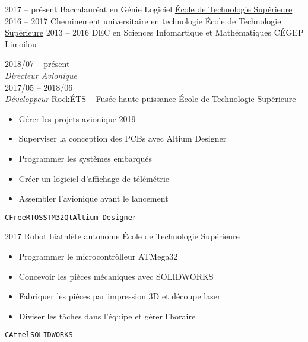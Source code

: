 \documentclass[9pt]{developercv} %
\begin{document}
\begin{minipage}[t]{0.8\textwidth}

\begin{entrylist}
	\entry
		{2017 -- présent}
		{Baccalauréat en Génie Logiciel}
		{\href{https://etsmtl.ca}{École de Technologie Supérieure}}
		{\vspace{-14pt}}
	\entry
		{2016 -- 2017}
		{Cheminement universitaire en technologie}
		{\href{https://etsmtl.ca}{École de Technologie Supérieure}}
		{\vspace{-14pt}}
	\entry
		{2013 -- 2016}
		{DEC en Sciences Infomartique et Mathématiques}
		{CÉGEP Limoilou}
		{\vspace{-14pt}}
\end{entrylist}



\begin{entrylist}
	\entry
		{2018/07 -- présent\\{\small\emph{Directeur Avionique}}\\2017/05 -- 2018/06\\{\small\emph{Développeur}}}
		{\href{https://clubrockets.ca/}{RockÉTS -- Fusée haute puissance}}
		{\href{https://clubrockets.ca/}{École de Technologie Supérieure}}
		{
			\vspace{-14pt}
			\begin{itemize}
				\renewcommand{\labelitemi}{\raisebox{.45ex}{\rule{.6ex}{.6ex}}}
				\setlength\itemsep{-1pt}
				\item Gérer les projets avionique 2019
				\item Superviser la conception des PCBs avec Altium Designer
				\item Programmer les systèmes embarqués
				\item Créer un logiciel d'affichage de télémétrie
				\item Assembler l'avionique avant le lancement
			\end{itemize}
			\vspace{-4pt}
			\texttt{C}\slashsep\texttt{FreeRTOS}\slashsep\texttt{STM32}\slashsep\texttt{Qt}\slashsep\texttt{Altium Designer}
		}
	\entry
		{2017}
		{Robot biathlète autonome}
		{École de Technologie Supérieure}
		{
			\vspace{-14pt}
			\begin{itemize}
				\renewcommand{\labelitemi}{\raisebox{.45ex}{\rule{.6ex}{.6ex}}}
				\setlength\itemsep{-1pt}
				\item Programmer le microcontrôlleur ATMega32
				\item Concevoir les pièces mécaniques avec SOLIDWORKS
				\item Fabriquer les pièces par impression 3D et découpe laser
				\item Diviser les tâches dans l'équipe et gérer l'horaire
			\end{itemize}
			\vspace{-4pt}
			\texttt{C}\slashsep\texttt{Atmel}\slashsep\texttt{SOLIDWORKS}
		}
\end{entrylist}


\end{minipage}
\end{document}
